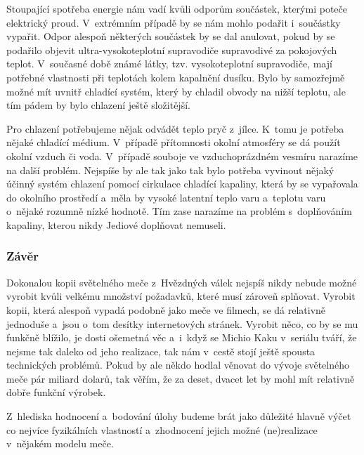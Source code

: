 {Stoupající spotřeba energie nám vadí kvůli odporům součástek, kterými poteče 
elektrický proud. V~extrémním případě by se nám mohlo podařit i~součástky 
vypařit. Odpor alespoň některých součástek by se dal anulovat, pokud by se 
podařilo objevit ultra-vysokoteplotní supravodiče supravodivé za pokojových 
teplot. V~současné době známé látky, tzv. vysokoteplotní supravodiče, mají
potřebné vlastnosti při teplotách kolem kapalnění dusíku. Bylo by samozřejmě
možné mít uvnitř chladící systém, který by chladil obvody na nižší teplotu, ale
tím pádem by bylo chlazení ještě složitější.

Pro chlazení potřebujeme nějak odvádět teplo pryč z~jílce. K~tomu je potřeba
nějaké chladící médium. V~případě přítomnosti okolní atmosféry se dá použít 
okolní vzduch či voda. V~případě souboje ve vzduchoprázdném vesmíru narazíme
na další problém. Nejspíše by ale tak jako tak bylo potřeba vyvinout nějaký 
účinný systém chlazení pomocí cirkulace chladící kapaliny, která by se vypařovala
do okolního prostředí a~měla by vysoké latentní teplo varu a~teplotu varu
o~nějaké rozumně nízké hodnotě. Tím zase narazíme na problém s~doplňováním
kapaliny, kterou nikdy Jediové doplňovat nemuseli.

\subsubsection{Závěr}
Dokonalou kopii světelného meče z~Hvězdných válek nejspíš nikdy nebude možné 
vyrobit kvůli velkému množství požadavků, které musí zároveň splňovat. 
Vyrobit kopii, která alespoň vypadá podobně jako meče ve filmech, se dá relativně
jednoduše a~jsou o~tom desítky internetových stránek. Vyrobit něco, co by se mu
funkčně blížilo, je dosti ošemetná věc a~i~když se Michio Kaku v~seriálu tváří,
že nejsme tak daleko od jeho realizace, tak nám v~cestě stojí ještě spousta 
technických problémů. Pokud by ale někdo hodlal věnovat do vývoje světelného
meče pár miliard dolarů, tak věřím, že za deset, dvacet let by mohl mít 
relativně dobře funkční výrobek.

\ifyearbook
\else
Z~hlediska hodnocení a~bodování úlohy budeme brát jako důležité hlavně výčet
co nejvíce fyzikálních vlastností a~zhodnocení jejich možné (ne)realizace
v~nějakém modelu meče.
\fi


}
